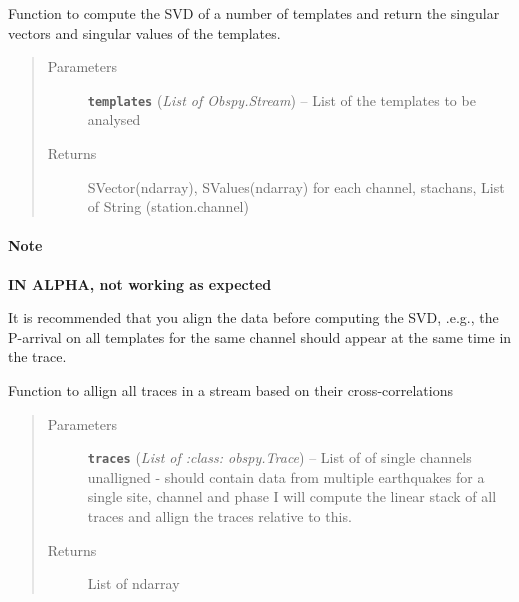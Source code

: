 \documentclass[a4paper,10pt,english]{sphinxmanual}
\begin{document}
\begin{fulllineitems}
\label{utils:clustering.SVD_testing}
Function to compute the SVD of a number of templates and return the singular
vectors and singular values of the templates.
\begin{quote}\begin{description}
\item[{Parameters}] \leavevmode
\textbf{\texttt{templates}} (\emph{List of Obspy.Stream}) -- List of the templates to be analysed

\item[{Returns}] \leavevmode
SVector(ndarray), SValues(ndarray) for each channel, stachans, List
of String (station.channel)

\end{description}\end{quote}
\paragraph{Note}

\textbf{IN ALPHA, not working as expected}

It is recommended that you align the data before computing the SVD, .e.g.,
the P-arrival on all templates for the same channel should appear at the same
time in the trace.

\end{fulllineitems}


\begin{fulllineitems}
\label{utils:clustering.allign_traces}
Function to allign all traces in a stream based on their cross-correlations
\begin{quote}\begin{description}
\item[{Parameters}] \leavevmode
\textbf{\texttt{traces}} (\emph{List of :class: obspy.Trace}) -- List of of single channels unalligned - should contain            data from multiple earthquakes for a single site, channel and phase            I will compute the linear stack of all traces and allign the traces            relative to this.

\item[{Returns}] \leavevmode
List of ndarray

\end{description}\end{quote}

\end{fulllineitems}
\end{document}

